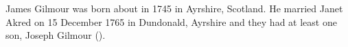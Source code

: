 
James Gilmour was born about in 1745 in Ayrshire, Scotland.
He married Janet Akred on 15 December 1765 in Dundonald, Ayrshire and they had at least one son, Joseph Gilmour ().



